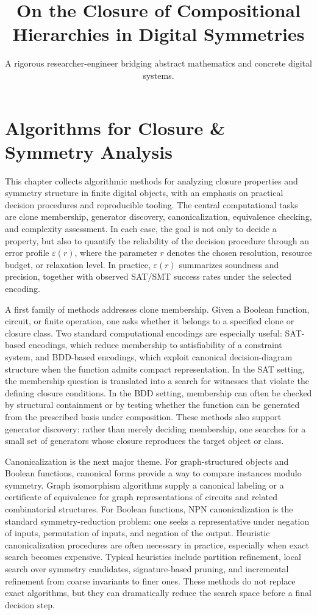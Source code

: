 \documentclass[11pt]{article}
\title{On the Closure of Compositional Hierarchies in Digital Symmetries}
\author{A rigorous researcher-engineer bridging abstract mathematics and concrete digital systems.}
\begin{document}
\section*{Algorithms for Closure \& Symmetry Analysis}

This chapter collects algorithmic methods for analyzing closure properties and symmetry structure in finite digital objects, with an emphasis on practical decision procedures and reproducible tooling. The central computational tasks are clone membership, generator discovery, canonicalization, equivalence checking, and complexity assessment. In each case, the goal is not only to decide a property, but also to quantify the reliability of the decision procedure through an error profile \(\varepsilon(r)\), where the parameter \(r\) denotes the chosen resolution, resource budget, or relaxation level. In practice, \(\varepsilon(r)\) summarizes soundness and precision, together with observed SAT/SMT success rates under the selected encoding.

A first family of methods addresses clone membership. Given a Boolean function, circuit, or finite operation, one asks whether it belongs to a specified clone or closure class. Two standard computational encodings are especially useful: SAT-based encodings, which reduce membership to satisfiability of a constraint system, and BDD-based encodings, which exploit canonical decision-diagram structure when the function admits compact representation. In the SAT setting, the membership question is translated into a search for witnesses that violate the defining closure conditions. In the BDD setting, membership can often be checked by structural containment or by testing whether the function can be generated from the prescribed basis under composition. These methods also support generator discovery: rather than merely deciding membership, one searches for a small set of generators whose closure reproduces the target object or class.

Canonicalization is the next major theme. For graph-structured objects and Boolean functions, canonical forms provide a way to compare instances modulo symmetry. Graph isomorphism algorithms supply a canonical labeling or a certificate of equivalence for graph representations of circuits and related combinatorial structures. For Boolean functions, NPN canonicalization is the standard symmetry-reduction problem: one seeks a representative under negation of inputs, permutation of inputs, and negation of the output. Heuristic canonicalization procedures are often necessary in practice, especially when exact search becomes expensive. Typical heuristics include partition refinement, local search over symmetry candidates, signature-based pruning, and incremental refinement from coarse invariants to finer ones. These methods do not replace exact algorithms, but they can dramatically reduce the search space before a final decision step.
\end{document}
